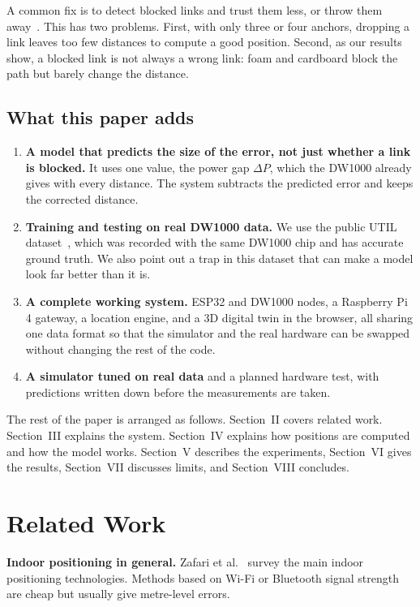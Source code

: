\documentclass[conference]{IEEEtran}
\begin{document}
A common fix is to detect blocked links and trust them less, or throw them
away~\cite{kolakowski2017first,barral2019nlos}. This has two problems. First,
with only three or four anchors, dropping a link leaves too few distances
to compute a good position. Second, as our results show, a blocked link is
not always a wrong link: foam and cardboard block the path but barely change
the distance.

\subsection{What this paper adds}
\begin{enumerate}
    \item \textbf{A model that predicts the size of the error, not just
    whether a link is blocked.} It uses one value, the power gap $\Delta P$,
    which the DW1000 already gives with every distance. The system subtracts
    the predicted error and keeps the corrected distance.
    \item \textbf{Training and testing on real DW1000 data.} We use the
    public UTIL dataset~\cite{zhao2024util}, which was recorded with the
    same DW1000 chip and has accurate ground truth. We also point out a
    trap in this dataset that can make a model look far better than it is.
    \item \textbf{A complete working system.} ESP32 and DW1000 nodes, a
    Raspberry Pi 4 gateway, a location engine, and a 3D digital twin in the
    browser, all sharing one data format so that the simulator and the real
    hardware can be swapped without changing the rest of the code.
    \item \textbf{A simulator tuned on real data} and a planned hardware
    test, with predictions written down before the measurements are taken.
\end{enumerate}

The rest of the paper is arranged as follows. Section~II covers related
work. Section~III explains the system. Section~IV explains how positions
are computed and how the model works. Section~V describes the experiments,
Section~VI gives the results, Section~VII discusses limits, and
Section~VIII concludes.

\section{Related Work}
\textbf{Indoor positioning in general.} Zafari et al.~\cite{zafari2019survey}
survey the main indoor positioning technologies. Methods based on Wi-Fi or
Bluetooth signal strength are cheap but usually give metre-level errors.
\end{document}
